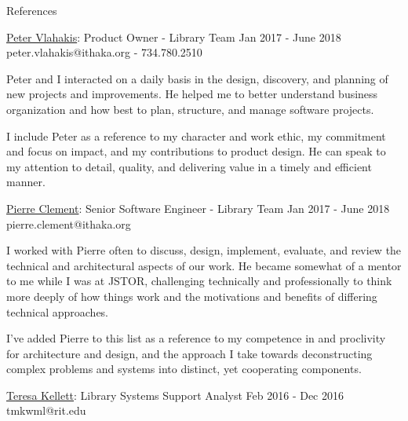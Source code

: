 \documentclass{resume} %
\begin{document}
  \begin{rSection}{References}

    \begin{rSubsection}{\underline{Peter Vlahakis}: Product Owner - Library Team }{ Jan 2017 - June 2018 }{peter.vlahakis@ithaka.org - 734.780.2510}

      \item Peter and I interacted on a daily basis in the design, discovery, and planning of new projects and improvements. He helped me to better understand business organization and how best to plan, structure, and manage software projects. \newline

      \item I include Peter as a reference to my character and work ethic, my commitment and focus on impact, and my contributions to product design. He can speak to my attention to detail, quality, and delivering value in a timely and efficient manner. \newline

    \end{rSubsection}

    \begin{rSubsection}{\underline{Pierre Clement}: Senior Software Engineer - Library Team }{ Jan 2017 - June 2018 }{pierre.clement@ithaka.org}

      \item I worked with Pierre often to discuss, design, implement, evaluate, and review the technical and architectural aspects of our work. He became somewhat of a mentor to me while I was at JSTOR, challenging technically and professionally to think more deeply of how things work and the motivations and benefits of differing technical approaches. \newline

      \item I've added Pierre to this list as a reference to my competence in and proclivity for architecture and design, and the approach I take towards deconstructing complex problems and systems into distinct, yet cooperating components. \newline \newline

    \end{rSubsection}

    \begin{rSubsection}{\underline{Teresa Kellett}: Library Systems Support Analyst }{ Feb 2016 - Dec 2016 }{tmkwml@rit.edu}


\end{rSubsection}
\end{rSection}
\end{document}

